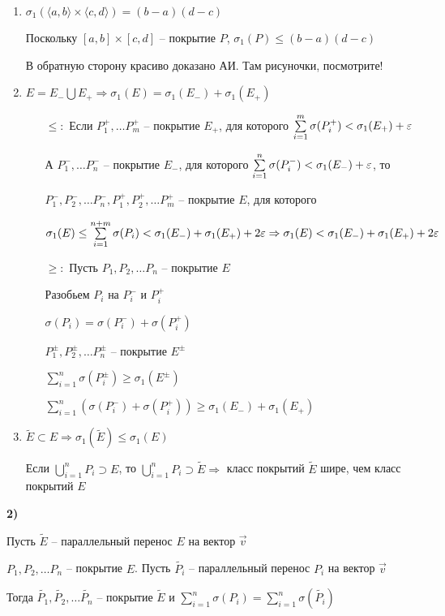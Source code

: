 \documentclass[12pt]{article}
\newcommand{\q}[1]{\langle #1 \rangle}
\begin{document}
\begin{enumerate}
    \item $\sigma_1(\q{a, b} \times \q{c, d}) = (b - a)(d - c)$
    
    Поскольку $[a, b] \times [c, d]$ -- покрытие $P$, $\sigma_1(P) \leq (b - a)(d - c)$

    В обратную сторону красиво доказано АИ. Там рисуночки, посмотрите!

    \item $E = E_- \bigcup E_+ \Rightarrow \sigma_1(E) = \sigma_1(E_-) + \sigma_1(E_+)$
    
    \begin{itemize}
        \item[$\leq :$] Если $P_1^+, \ldots P_m^+$ -- покрытие $E_+$, для которого $\sum\limits_{i = 1}^m \sigma(P_i^+) < \sigma_1(E_+) + \varepsilon$
        
        А $P_1^-, \ldots P_n^-$ -- покрытие $E_-$, для которого $\sum\limits_{i = 1}^n \sigma(P_i^-) < \sigma_1(E_-) + \varepsilon$, то

        $P_1^-, P_2^-, \ldots P_n^-, P_1^+, P_2^+, \ldots P_m^+$ -- покрытие $E$, для которого 
        
        $\sigma_1(E) \leq \sum\limits_{i = 1}^{n + m} \sigma(P_i) < \sigma_1(E_-) + \sigma_1(E_+) + 2\varepsilon \Rightarrow \sigma_1(E) < \sigma_1(E_-) + \sigma_1(E_+) + 2\varepsilon$

        \item[$\geq :$] Пусть $P_1, P_2, \ldots P_n$ -- покрытие $E$
        
        Разобьем $P_i$ на $P_i^-$ и $P_i^+$

        $\sigma(P_i) = \sigma(P_i^-) + \sigma(P_i^+)$

        $P_1^\pm, P_2^\pm, \ldots P_n^\pm$ -- покрытие $E^\pm$

        $\sum\limits_{i = 1}^n \sigma(P_i^\pm) \geq \sigma_1(E^\pm)$

        $\sum\limits_{i = 1}^n (\sigma(P_i^-) + \sigma(P_i^+)) \geq \sigma_1(E_-) + \sigma_1(E_+)$
    \end{itemize}

    \item $\tilde{E} \subset E \Rightarrow \sigma_1(\tilde{E}) \leq \sigma_1(E)$
    
    Если $\bigcup\limits_{i = 1}^n P_i \supset E$, то $\bigcup\limits_{i = 1}^n P_i \supset \tilde{E} \Rightarrow$ класс покрытий $\tilde{E}$ шире, чем класс покрытий $E$
\end{enumerate}

\textbf{2)}

Пусть $\tilde{E}$ -- параллельный перенос $E$ на вектор $\overrightarrow{v}$

$P_1, P_2, \ldots P_n$ -- покрытие $E$. Пусть $\tilde{P_i}$ -- параллельный перенос $P_i$ на вектор $\overrightarrow{v}$

Тогда $\tilde{P_1}, \tilde{P_2}, \ldots \tilde{P_n}$ -- покрытие $\tilde{E}$ и $\sum\limits_{i = 1}^n \sigma(P_i) = \sum\limits_{i = 1}^n \sigma(\tilde{P_i})$
\end{document}
